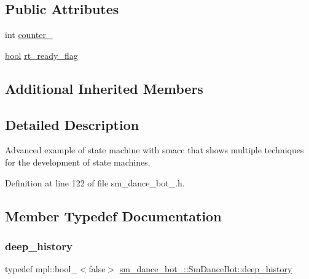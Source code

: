 \subsection*{Public Attributes}
\begin{DoxyCompactItemize}
\item 
int \hyperlink{structsm__dance__bot__2_1_1SmDanceBot_a35b55719b3e4a8d62e9beffc8d2b1308}{counter\+\_}
\item 
\hyperlink{classbool}{bool} \hyperlink{structsm__dance__bot__2_1_1SmDanceBot_a9929548acc196867c0c368cdd778ea76}{rt\+\_\+ready\+\_\+flag}
\end{DoxyCompactItemize}
\subsection*{Additional Inherited Members}


\subsection{Detailed Description}
Advanced example of state machine with smacc that shows multiple techniques for the development of state machines. 

Definition at line 122 of file sm\+\_\+dance\+\_\+bot\+\_.\+h.



\subsection{Member Typedef Documentation}
\mbox{\label{structsm__dance__bot__2_1_1SmDanceBot_a2e6cf41dd05f6fc4b8fa16b249851bfc}} 
\subsubsection{\texorpdfstring{deep\+\_\+history}{deep\_history}}
{\footnotesize\ttfamily typedef mpl\+::bool\+\_\+$<$false$>$ \hyperlink{structsm__dance__bot__2_1_1SmDanceBot_a2e6cf41dd05f6fc4b8fa16b249851bfc}{sm\+\_\+dance\+\_\+bot\+\_\+::\+Sm\+Dance\+Bot\+::deep\+\_\+history}}



